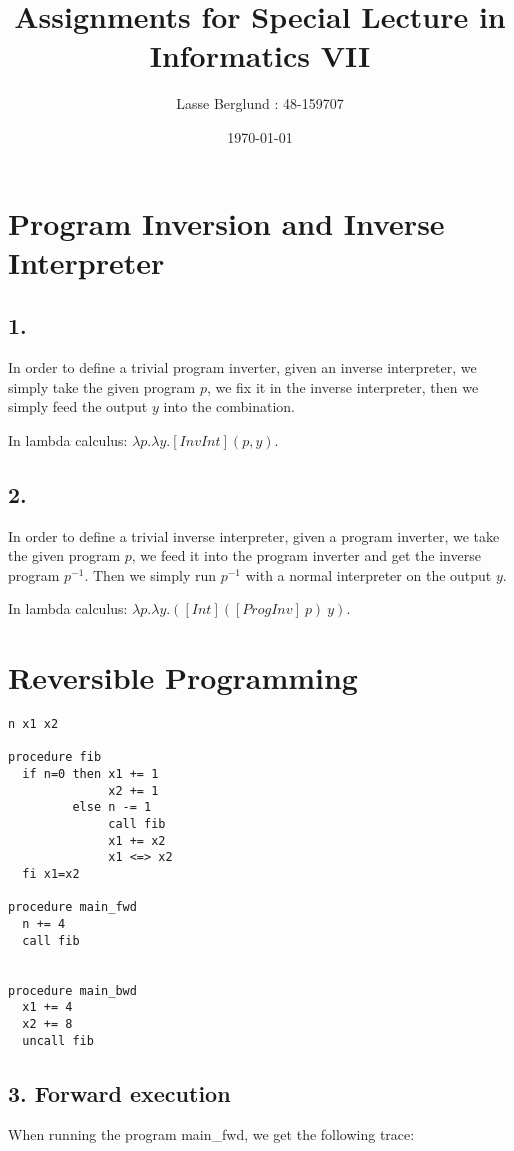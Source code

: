 \documentclass[12pt]{report}
\title{Assignments for Special Lecture in Informatics VII}
\author{Lasse Berglund : 48-159707}
\date{\today}
\begin{document}
\maketitle

\section*{Program Inversion and Inverse Interpreter}
\subsection*{1.}
  In order to define a trivial program inverter, given an inverse interpreter, we simply take the given program $p$, we fix it in the inverse interpreter, then we simply feed the output $y$ into the combination.

  In lambda calculus: $\lambda p. \lambda y. [InvInt] (p,y)$.

\subsection*{2.}
  In order to define a trivial inverse interpreter, given a program inverter, we take the given program $p$, we feed it into the program inverter and get the inverse program $p^{-1}$. Then we simply run $p^{-1}$ with a normal interpreter on the output $y$.


  In lambda calculus: $\lambda p. \lambda y. ( [Int] ( [ProgInv] \ p ) \ y)$.


\section*{Reversible Programming}
\begin{verbatim}
n x1 x2

procedure fib
  if n=0 then x1 += 1
              x2 += 1
         else n -= 1
              call fib
              x1 += x2
              x1 <=> x2
  fi x1=x2

procedure main_fwd
  n += 4
  call fib


procedure main_bwd
  x1 += 4
  x2 += 8
  uncall fib

\end{verbatim}



\subsection*{3. Forward execution} 
When running the program main\_fwd, we get the following trace:
\end{document}

